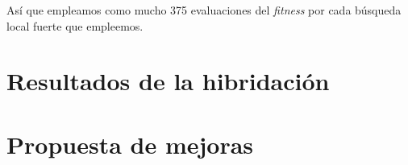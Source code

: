 \documentclass[11pt]{article}
\begin{document}
Así que empleamos como mucho 375 evaluaciones del \emph{fitness} por cada búsqueda local fuerte que empleemos.

\pagebreak
\section{Resultados de la hibridación}

\pagebreak
\section{Propuesta de mejoras} \label{mejoras}


\pagebreak



\end{document}
